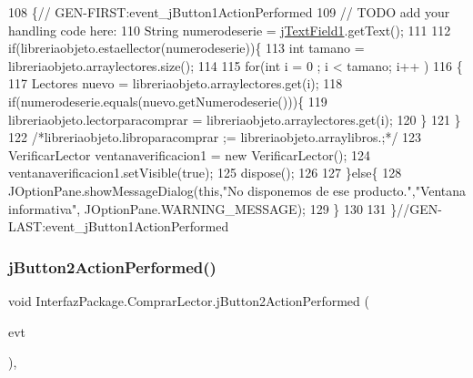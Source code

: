 \begin{DoxyCode}
108                                                                          \{\textcolor{comment}{//
      GEN-FIRST:event\_jButton1ActionPerformed}
109         \textcolor{comment}{// TODO add your handling code here:}
110         String numerodeserie = \mbox{\hyperlink{class_interfaz_package_1_1_comprar_lector_abba4b0576e701088c0c1389d7e28aaa9}{jTextField1}}.getText();
111         
112         \textcolor{keywordflow}{if}(libreriaobjeto.estaellector(numerodeserie))\{
113             \textcolor{keywordtype}{int} tamano = libreriaobjeto.arraylectores.size();
114             
115             \textcolor{keywordflow}{for}(\textcolor{keywordtype}{int} i = 0 ; i < tamano; i++ )
116             \{
117                 Lectores nuevo = libreriaobjeto.arraylectores.get(i);
118                 \textcolor{keywordflow}{if}(numerodeserie.equals(nuevo.getNumerodeserie()))\{
119                 libreriaobjeto.lectorparacomprar = libreriaobjeto.arraylectores.get(i);
120                 \}
121             \}
122             \textcolor{comment}{/*libreriaobjeto.libroparacomprar ;= libreriaobjeto.arraylibros.;*/}
123             VerificarLector ventanaverificacion1 = \textcolor{keyword}{new} VerificarLector();
124             ventanaverificacion1.setVisible(\textcolor{keyword}{true});
125             dispose();
126             
127         \}\textcolor{keywordflow}{else}\{
128             JOptionPane.showMessageDialog(\textcolor{keyword}{this},\textcolor{stringliteral}{"No disponemos de ese producto."},\textcolor{stringliteral}{"Ventana informativa"},
      JOptionPane.WARNING\_MESSAGE);
129         \}
130         
131     \}\textcolor{comment}{//GEN-LAST:event\_jButton1ActionPerformed}
\end{DoxyCode}
\mbox{\label{class_interfaz_package_1_1_comprar_lector_a67a613921bca8746fa553f8d7f28b6eb}} 
\subsubsection{\texorpdfstring{j\+Button2\+Action\+Performed()}{jButton2ActionPerformed()}}
{\footnotesize\ttfamily void Interfaz\+Package.\+Comprar\+Lector.\+j\+Button2\+Action\+Performed (\begin{DoxyParamCaption}\item[{java.\+awt.\+event.\+Action\+Event}]{evt }\end{DoxyParamCaption})\hspace{0.3cm}{\ttfamily [inline]}, {\ttfamily [private]}}


